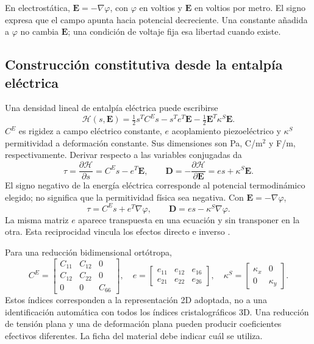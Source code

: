 En electrostática, $\mathbf E=-\nabla\varphi$, con $\varphi$ en voltios y $\mathbf E$ en voltios por metro. El signo expresa que el campo apunta hacia potencial decreciente. Una constante añadida a $\varphi$ no cambia $\mathbf E$; una condición de voltaje fija esa libertad cuando existe.

\subsection{Construcción constitutiva desde la entalpía eléctrica}
Una densidad lineal de entalpía eléctrica puede escribirse
\begin{equation}
\mathcal H(s,\mathbf E)=\tfrac12s^TC^Es-s^Te^T\mathbf E
-\tfrac12\mathbf E^T\kappa^S\mathbf E.
\label{eq:entalpia}
\end{equation}
$C^E$ es rigidez a campo eléctrico constante, $e$ acoplamiento piezoeléctrico y $\kappa^S$ permitividad a deformación constante. Sus dimensiones son Pa, C/m$^2$ y F/m, respectivamente. Derivar respecto a las variables conjugadas da
\begin{equation}
\tau=\frac{\partial\mathcal H}{\partial s}=C^Es-e^T\mathbf E,
\qquad
\mathbf D=-\frac{\partial\mathcal H}{\partial\mathbf E}=es+\kappa^S\mathbf E.
\label{eq:constitutivo}
\end{equation}
El signo negativo de la energía eléctrica corresponde al potencial termodinámico elegido; no significa que la permitividad física sea negativa. Con $\mathbf E=-\nabla\varphi$,
\begin{equation}
\tau=C^Es+e^T\nabla\varphi,\qquad
\mathbf D=es-\kappa^S\nabla\varphi.
\label{eq:constitutivo-potencial}
\end{equation}
La misma matriz $e$ aparece transpuesta en una ecuación y sin transponer en la otra. Esta reciprocidad vincula los efectos directo e inverso \cite{lahmer2008,nye2012crystals}.

Para una reducción bidimensional ortótropa,
\begin{equation}
C^E=\begin{bmatrix}C_{11}&C_{12}&0\\C_{12}&C_{22}&0\\0&0&C_{66}\end{bmatrix},
\quad e=\begin{bmatrix}e_{11}&e_{12}&e_{16}\\e_{21}&e_{22}&e_{26}\end{bmatrix},
\quad\kappa^S=\begin{bmatrix}\kappa_x&0\\0&\kappa_y\end{bmatrix}.
\end{equation}
Estos índices corresponden a la representación 2D adoptada, no a una identificación automática con todos los índices cristalográficos 3D. Una reducción de tensión plana y una de deformación plana pueden producir coeficientes efectivos diferentes. La ficha del material debe indicar cuál se utiliza.

